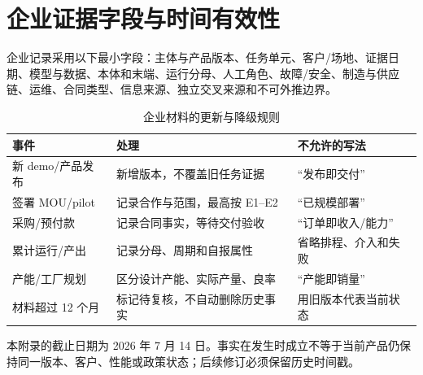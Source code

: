 \chapter{企业证据字段与时间有效性}
\label{app:company-evidence-fields}

企业记录采用以下最小字段：主体与产品版本、任务单元、客户/场地、证据日期、模型与数据、本体和末端、运行分母、人工角色、故障/安全、制造与供应链、运维、合同类型、信息来源、独立交叉来源和不可外推边界。

\begin{table}[H]
\centering\small
\caption{企业材料的更新与降级规则}
\label{tab:company-evidence-validity}
\begin{tabularx}{\textwidth}{p{}YY}
\toprule
事件 & 处理 & 不允许的写法 \\
\midrule
新 demo/产品发布 & 新增版本，不覆盖旧任务证据 & “发布即交付” \\
签署 MOU/pilot & 记录合作与范围，最高按 E1--E2 & “已规模部署” \\
采购/预付款 & 记录合同事实，等待交付验收 & “订单即收入/能力” \\
累计运行/产出 & 记录分母、周期和自报属性 & 省略排程、介入和失败 \\
产能/工厂规划 & 区分设计产能、实际产量、良率 & “产能即销量” \\
材料超过 12 个月 & 标记待复核，不自动删除历史事实 & 用旧版本代表当前状态 \\
\bottomrule
\end{tabularx}
\end{table}

本附录的截止日期为 2026 年 7 月 14 日。事实在发生时成立不等于当前产品仍保持同一版本、客户、性能或政策状态；后续修订必须保留历史时间戳。

